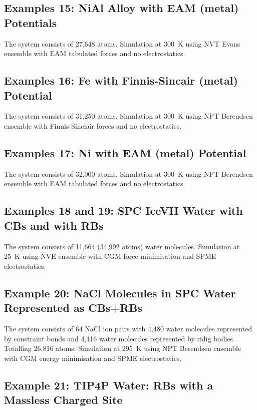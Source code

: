 \subsection{Examples 15: NiAl Alloy with EAM (metal) Potentials}

The system consists of 27,648 atoms.  Simulation at 300~K using NVT
Evans ensemble with EAM tabulated forces and no electrostatics.

\subsection{Examples 16: Fe with Finnis-Sincair (metal) Potential}

The system consists of 31,250 atoms.  Simulation at 300~K using NPT
Berendsen ensemble with Finnis-Sinclair forces and no electrostatics.

\subsection{Examples 17: Ni with EAM (metal) Potential}

The system consists of 32,000 atoms.  Simulation at 300~K using NPT
Berendsen ensemble with EAM tabulated forces and no electrostatics.

\subsection{Examples 18 and 19: SPC IceVII Water with CBs and with RBs}

The system consists of 11,664 (34,992 atoms) water molecules. Simulation
at 25~K using NVE ensemble with CGM force minimisation and SPME electrostatics.

\subsection{Example 20: NaCl Molecules in SPC Water Represented as CBs+RBs}

The system consists of 64 NaCl ion pairs with 4,480 water molecules
represented by constraint bonds and 4,416 water molecules represented
by ridig bodies.  Totalling 26,816 atoms.  Simulation at 295~K using NPT
Berendsen ensemble with CGM energy minimisation and SPME electrostatics.

\subsection{Example 21: TIP4P Water: RBs with a Massless Charged Site}

